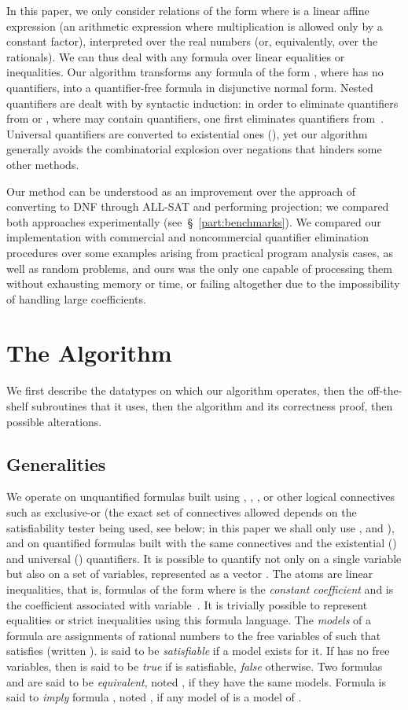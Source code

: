 In this paper, we only consider relations of the form  where  is a linear affine expression (an arithmetic expression where multiplication is allowed only by a constant factor), interpreted over the real numbers (or, equivalently, over the rationals). We can thus deal with any formula over linear equalities or inequalities. Our algorithm transforms any formula of the form , where  has no quantifiers, into a quantifier-free formula  in disjunctive normal form. Nested quantifiers are dealt with by syntactic induction: in order to eliminate quantifiers from  or , where  may contain quantifiers, one first eliminates quantifiers from~. Universal quantifiers are converted to existential ones (), yet our algorithm generally avoids the combinatorial explosion over negations that hinders some other methods.

Our method can be understood as an improvement over the approach of converting to DNF through ALL-SAT and performing projection; we compared both approaches experimentally (see~\S~\ref{part:benchmarks}). We compared our implementation with commercial and noncommercial quantifier elimination procedures over some examples arising from practical program analysis cases, as well as random problems, and ours was the only one capable of processing them without exhausting memory or time, or failing altogether due to the impossibility of handling large coefficients.

\section{The Algorithm}
We first describe the datatypes on which our algorithm operates, then the off-the-shelf subroutines that it uses, then the algorithm and its correctness proof, then possible alterations.

\subsection{Generalities}
We operate on unquantified formulas built using , , ,  or other logical connectives such as exclusive-or (the exact set of connectives allowed depends on the satisfiability tester being used, see below; in this paper we shall only use ,  and ), and on quantified formulas built with the same connectives and the existential () and universal () quantifiers. It is possible to quantify not only on a single variable but also on a set of variables, represented as a vector . The atoms are linear inequalities, that is, formulas of the form  where  is the \emph{constant coefficient} and  is the coefficient associated with variable~. It is trivially possible to represent equalities or strict inequalities using this formula language.
The \emph{models} of a formula  are assignments  of rational numbers to the free variables of  such that  satisfies  (written ).  is said to be \emph{satisfiable} if a model exists for it. If  has no free variables, then  is said to be \emph{true} if  is satisfiable, \emph{false} otherwise. Two formulas  and  are said to be \emph{equivalent}, noted , if they have the same models. Formula  is said to \emph{imply} formula , noted , if any model of  is a model of .

